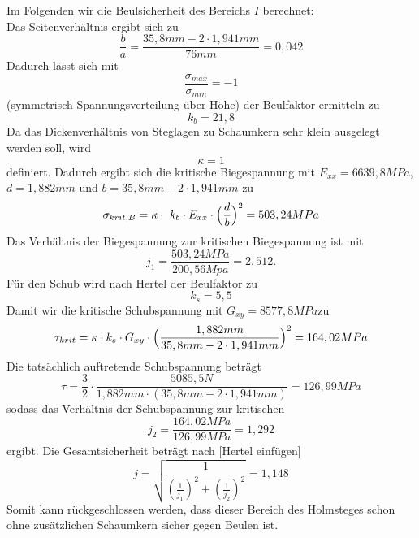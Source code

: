 \noindent Im Folgenden wir die Beulsicherheit des Bereichs $I$ berechnet:\\
\noindent Das Seitenverhältnis ergibt sich zu 
\begin{equation}
	\frac{b}{a}=\frac{35,8 mm-2\cdot 1,941 mm}{76 mm}=0,042
\end{equation}
Dadurch lässt sich mit 
\begin{equation}
	\frac{\sigma_{max}}{\sigma_{min}}=-1
\end{equation}
(symmetrisch Spannungsverteilung über Höhe) der Beulfaktor ermitteln zu
\begin{equation}
	k_{b} = 21,8
\end{equation}
Da das Dickenverhältnis von Steglagen zu Schaumkern sehr klein ausgelegt werden soll, wird
\begin{equation}
	\kappa = 1
\end{equation}
definiert. Dadurch ergibt sich die kritische Biegespannung mit $E_{xx}=6639,8MPa$, $d=1,882mm$ und $b=35,8mm-2\cdot 1,941mm$ zu
\begin{equation}
	\sigma_{krit,B}=\kappa\cdot\ k_{b}\cdot E_{xx}\cdot\Bigl(\frac{d}{b}\Bigr)^{2}=503,24MPa
\end{equation}
Das Verhältnis der Biegespannung zur kritischen Biegespannung ist mit 
\begin{equation}
	j_{1}=\frac{503,24MPa}{200,56 Mpa}=2,512.
\end{equation}
 Für den Schub wird nach Hertel der Beulfaktor zu
\begin{equation}
	k_{s}=5,5
\end{equation}
Damit wir die kritische Schubspannung mit $G_{xy}=8577,8MPa$zu 
\begin{equation}
	\tau_{krit}=\kappa\cdot k_{s}\cdot G_{xy}\cdot\Bigl(\frac{1,88 2mm}{35,8 mm - 2\cdot 1,941  mm}\Bigr)^{2}=164,02 MPa
\end{equation}
Die tatsächlich auftretende Schubspannung beträgt 
\begin{equation}
	\tau=\frac{3}{2}\cdot \frac{5085,5 N}{1,882 mm\cdot(35,8 mm-2\cdot 1,941 mm)}=126,99 MPa
\end{equation}
sodass das Verhältnis der Schubspannung zur kritischen 
\begin{equation}
	j_{2}=\frac{164,02 MPa}{126,99 MPa}= 1,292
\end{equation}
ergibt. Die Gesamtsicherheit beträgt nach [Hertel einfügen]
\begin{equation}
	j=\sqrt{\frac{1}{\left(\frac{1}{j_{1}}\right)^{2}+\left(\frac{1}{j_{2}}\right)^{2}}}=1,148
\end{equation}
Somit kann rückgeschlossen werden, dass dieser Bereich des Holmsteges schon ohne zusätzlichen Schaumkern sicher gegen Beulen ist.\\

